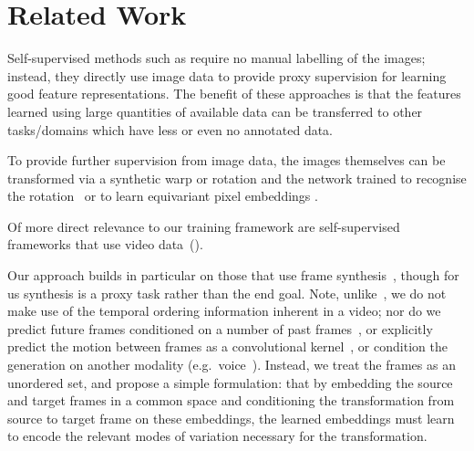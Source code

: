 \documentclass{bmvc2k}
\begin{document}
\section{Related Work}\label{sec:related}

Self-supervised methods such as \cite{Pathak16inp,Zhang16Col,doersch2015unsupervised,Noroozi16} require no manual labelling of the images;
instead, they directly use image data to provide proxy supervision for
learning good feature representations.  
The benefit of these approaches is that the  features learned using large quantities of available data can be transferred to other tasks/domains which have less or even no annotated data. 

To provide further supervision from image data, the images themselves can be transformed via a synthetic warp or rotation and the network trained to recognise the rotation~\cite{gidaris2018unsupervised} or to learn equivariant pixel embeddings \cite{Thewlis17a,Thewlis17b,novotny2018self}.


Of  more direct relevance to our training framework 
are self-supervised frameworks that use  video data~(\cite{Wang15,Fernando17ours,Misra16,lee2017unsupervised,jakab2018conditional,gan2018geometry,Wiles18a,xue2016visual,jia2016dynamic,
patraucean2015spatio,Chung17b,denton2017unsupervised,Agrawal15a,Zamir16}).

Our approach builds in particular on those that use frame
synthesis~\cite{xue2016visual,jia2016dynamic,patraucean2015spatio,denton2017unsupervised,Chung17b,Wiles18a},
though for us synthesis is a proxy task rather than the end goal.
Note, unlike~\cite{Wang15,Misra16,Fernando17ours,lee2017unsupervised},
we do not make use of the temporal ordering information inherent in a
video; nor do we predict future frames conditioned on a number of past
frames~\cite{patraucean2015spatio}, or explicitly predict the motion between frames as a
convolutional kernel~\cite{xue2016visual,jia2016dynamic}, or condition the generation on another modality
(e.g.\ voice~\cite{Chung17b}).  Instead, we treat the frames as an unordered set,  and
propose a simple formulation: that by embedding the source and target
frames in a common space and conditioning the transformation from
source to target frame on these embeddings, the learned embeddings
must learn to encode the relevant modes of variation necessary for the
transformation.
\end{document}
